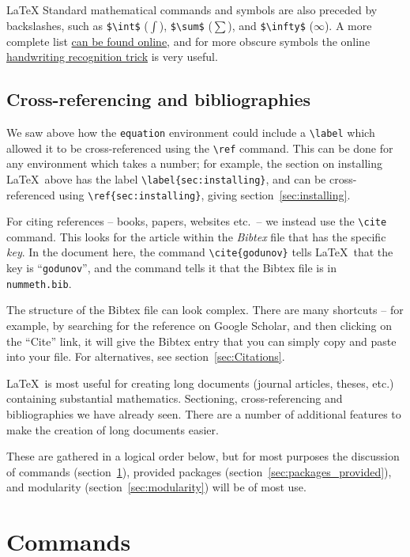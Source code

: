 \begin{chapter}{\LaTeX}
Standard mathematical commands and symbols are also preceded by backslashes, such as \verb|$\int$| ($\int$), \verb|$\sum$| ($\sum$), and \verb|$\infty$| ($\infty$). A more complete list \href{https://en.wikibooks.org/wiki/LaTeX/Mathematics}{can be found online}, and for more obscure symbols the online \href{http://detexify.kirelabs.org/classify.html}{handwriting recognition trick} is very useful.

\subsection{Cross-referencing and bibliographies}

We saw above how the \texttt{equation} environment could include a \verb|\label| which allowed it to be cross-referenced using the \verb|\ref| command. This can be done for any environment which takes a number; for example, the section on installing \LaTeX\ above has the label \verb|\label{sec:installing}|, and can be cross-referenced using \verb|\ref{sec:installing}|, giving section~\ref{sec:installing}.

For citing references -- books, papers, websites etc.\ -- we instead use the \verb|\cite| command. This looks for the article within the \emph{Bibtex} file that has the specific \emph{key}. In the document here, the command \verb|\cite{godunov}| tells \LaTeX\ that the key is ``\verb|godunov|'', and the command \verb|| tells it that the Bibtex file is in \texttt{nummeth.bib}.

The structure of the Bibtex file can look complex. There are many shortcuts -- for example, by searching for the reference on Google Scholar, and then clicking on the ``Cite'' link, it will give the Bibtex entry that you can simply copy and paste into your file. For alternatives, see section~\ref{sec:Citations}.


\LaTeX\ is most useful for creating long documents (journal articles, theses, etc.) containing substantial mathematics. Sectioning, cross-referencing and bibliographies we have already seen. There are a number of additional features to make the creation of long documents easier.

These are gathered in a logical order below, but for most purposes the discussion of commands (section~\ref{sec:commands}), provided packages (section~\ref{sec:packages_provided}), and modularity (section~\ref{sec:modularity}) will be of most use.

\section{Commands}
\label{sec:commands}


\end{chapter}
